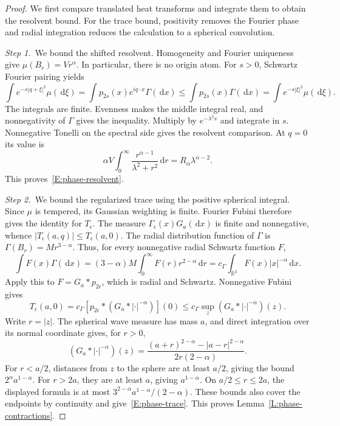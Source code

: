 \documentclass[12pt,oneside,openany]{book}
\numberwithin{equation}{section}
\theoremstyle{nogostyle}
\theoremstyle{definition}
\newcommand{\R}{\mathbb{R}}
\newcommand{\ud}{\,\mathrm{d}}
\begin{document}
\begin{proof}
  We first compare translated heat transforms and integrate them to obtain the
  resolvent bound. For the trace bound, positivity removes the Fourier phase
  and radial integration reduces the calculation to a spherical convolution.


  \medskip
  \noindent\textit{Step 1.~}We bound the shifted resolvent.
  Homogeneity and Fourier uniqueness give $\mu(B_r) = Vr^\alpha$. In particular,
  there is no origin atom. For $s > 0$, Schwartz Fourier pairing yields
  \[
    \int e^{-s|q+\xi|^2}\mu(\ud\xi)
    =\int p_{2s}(x)e^{iq\cdot x}\Gamma(\ud x)
    \le\int p_{2s}(x)\Gamma(\ud x)
    =\int e^{-s|\xi|^2}\mu(\ud\xi).
  \]
  The integrals are finite. Evenness makes the middle integral real, and
  nonnegativity of $\Gamma$ gives the inequality. Multiply by $e^{-\lambda^2s}$
  and integrate in $s$. Nonnegative Tonelli on the spectral side gives the
  resolvent comparison. At $q = 0$ its value is
  \[
    \alpha V\int_0^\infty\frac{r^{\alpha-1}}{\lambda^2+r^2}\ud r
    =R_\alpha\lambda^{\alpha-2}.
  \]
  This proves~\eqref{E:phase-resolvent}.


  \medskip
  \noindent\textit{Step 2.~}We bound the regularized trace using the positive
  spherical integral.
  Since $\mu$ is tempered, its Gaussian weighting is finite. Fourier Fubini
  therefore gives the identity for $T_\epsilon$. The measure
  $\Gamma_\epsilon(x)G_a(\ud x)$ is finite and nonnegative, whence
  $|T_\epsilon(a,q)| \le T_\epsilon(a,0)$. The radial distribution function of
  $\Gamma$ is $\Gamma(B_r) = Mr^{3-\alpha}$. Thus, for every nonnegative radial
  Schwartz function $F$,
  \[
    \int F(x)\Gamma(\ud x)
    =(3-\alpha)M\int_0^\infty F(r)r^{2-\alpha}\ud r
    =c_\Gamma\int_{\R^3}F(x)|x|^{-\alpha}\ud x.
  \]
  Apply this to $F = G_a*p_{2\epsilon}$, which is radial and Schwartz.
  Nonnegative Fubini gives
  \[
    T_\epsilon(a,0)
    =c_\Gamma[p_{2\epsilon}*(G_a*|\cdot|^{-\alpha})](0)
    \le c_\Gamma\sup_z(G_a*|\cdot|^{-\alpha})(z).
  \]
  Write $r = |z|$. The spherical wave measure has mass $a$, and direct
  integration over its normal coordinate gives, for $r > 0$,
  \[
    (G_a*|\cdot|^{-\alpha})(z)
    =\frac{(a+r)^{2-\alpha}-|a-r|^{2-\alpha}}
    {2r(2-\alpha)}.
  \]
  For $r < a/2$, distances from $z$ to the sphere are at least $a/2$, giving the
  bound $2^\alpha a^{1-\alpha}$. For $r > 2a$, they are at least $a$, giving
  $a^{1-\alpha}$. On $a/2 \le r \le 2a$, the displayed formula is at most
  $3^{2-\alpha}a^{1-\alpha}/(2-\alpha)$. These bounds also cover the endpoints
  by continuity and give~\eqref{E:phase-trace}. This proves
  Lemma~\ref{L:phase-contractions}.
\end{proof}
\end{document}
